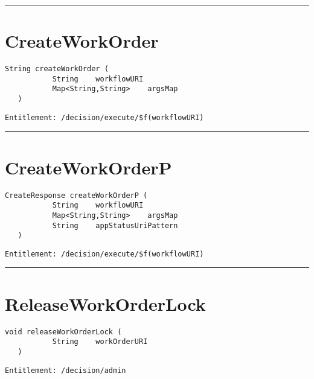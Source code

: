 \rule{12cm}{2pt}
\section{CreateWorkOrder}
\label{Api:CreateWorkOrder}
\begin{lstlisting}[style=nonumbers]
   String createWorkOrder (
           String    workflowURI
           Map<String,String>    argsMap
   )
\end{lstlisting}
\begin{Verbatim}[formatcom=\color{Maroon}]
  Entitlement: /decision/execute/$f(workflowURI)
\end{Verbatim}



\rule{12cm}{2pt}
\section{CreateWorkOrderP}
\label{Api:CreateWorkOrderP}
\begin{lstlisting}[style=nonumbers]
   CreateResponse createWorkOrderP (
           String    workflowURI
           Map<String,String>    argsMap
           String    appStatusUriPattern
   )
\end{lstlisting}
\begin{Verbatim}[formatcom=\color{Maroon}]
  Entitlement: /decision/execute/$f(workflowURI)
\end{Verbatim}



\rule{12cm}{2pt}
\section{ReleaseWorkOrderLock}
\label{Api:ReleaseWorkOrderLock}
\begin{lstlisting}[style=nonumbers]
   void releaseWorkOrderLock (
           String    workOrderURI
   )
\end{lstlisting}
\begin{Verbatim}[formatcom=\color{Maroon}]
  Entitlement: /decision/admin
\end{Verbatim}



